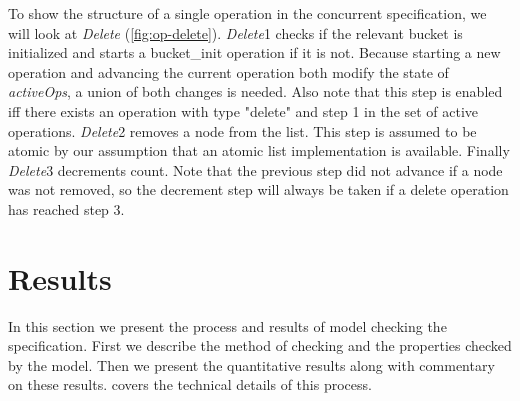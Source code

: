 \documentclass{uit-thesis}
\begin{document}
To show the structure of a single operation in the concurrent specification, we will look at \textit{Delete} (\autoref{fig:op-delete}). \textit{Delete}1 checks if the relevant bucket is initialized and starts a bucket\_init operation if it is not. Because starting a new operation and advancing the current operation both modify the state of \textit{activeOps}, a union of both changes is needed. Also note that this step is enabled iff there exists an operation with type "delete" and step 1 in the set of active operations. \textit{Delete}2 removes a node from the list. This step is assumed to be atomic by our assumption that an atomic list implementation is available. Finally \textit{Delete}3 decrements count. Note that the previous step did not advance if a node was not removed, so the decrement step will always be taken if a delete operation has reached step 3.

\chapter{Results}\label{ch:results}
In this section we present the process and results of model checking the specification. First we describe the method of checking and the properties checked by the model. Then we present the quantitative results along with commentary on these results.  covers the technical details of this process.
\end{document}
